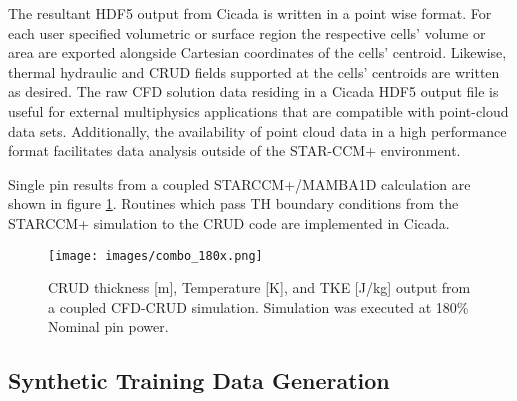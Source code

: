 The resultant HDF5 output from Cicada is written in a point wise format.  For each user specified volumetric or surface region the respective cells' volume or area are exported alongside Cartesian coordinates of the cells' centroid.  Likewise, thermal hydraulic and CRUD fields supported at the cells' centroids are written as desired.  The raw CFD solution data residing in a Cicada HDF5 output file is useful for external multiphysics applications that are compatible with point-cloud data sets.  Additionally, the availability of point cloud data in a high performance format facilitates data analysis outside of the STAR-CCM+ environment. 

Single pin results from a coupled STARCCM+/MAMBA1D calculation are shown in figure \ref{fig:cfd2ctf_map}.  Routines which pass TH boundary conditions from the STARCCM+ simulation to the CRUD code are implemented in Cicada.
\begin{figure}[!htbp]
\centering
\texttt{[image: images/combo\_180x.png]}
\caption{CRUD thickness [m], Temperature [K], and TKE [J/kg] output from a coupled CFD-CRUD simulation. Simulation was executed at 180\% Nominal pin power. \cite{slattery16}}
\label{fig:cfd2ctf_map}
\end{figure} 




\subsection{Synthetic Training Data Generation}
\label{chap:synth}

